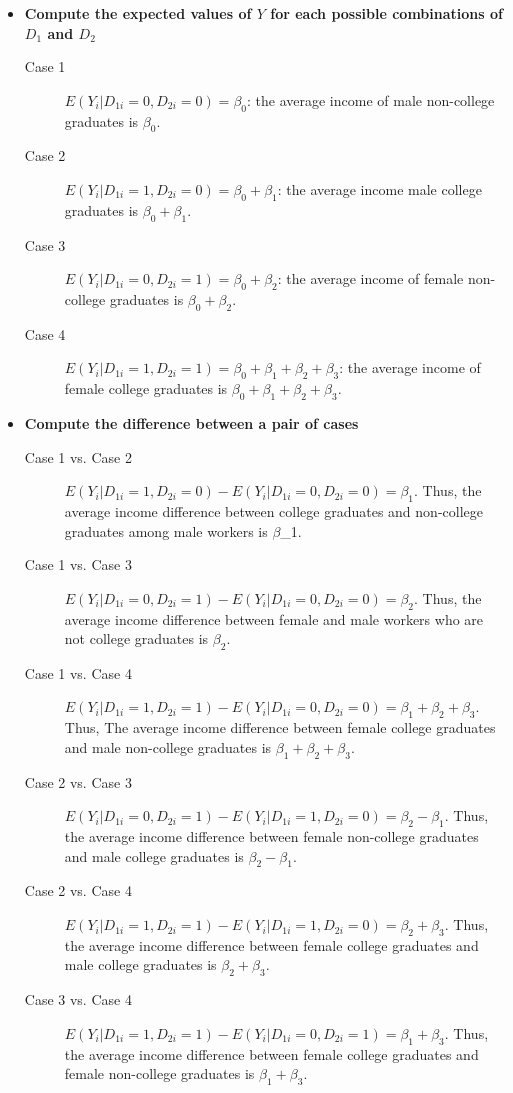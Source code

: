 \documentclass[a4paper,11pt]{article}
\begin{document}
\begin{itemize}
\item \textbf{Compute the expected values of \(Y\) for each possible combinations of \(D_1\) and \(D_2\)}
\label{sec:org00e8688}

\begin{description}
\item[{Case 1}] \(E(Y_i | D_{1i} = 0, D_{2i} = 0) = \beta_0\): the average
income of male non-college graduates is \(\beta_0\).
\item[{Case 2}] \(E(Y_i | D_{1i} = 1, D_{2i} = 0) = \beta_0 + \beta_1\): the
average income male college graduates is \(\beta_0 +
            \beta_1\).
\item[{Case 3}] \(E(Y_i | D_{1i} = 0, D_{2i} = 1) = \beta_0 + \beta_2\): the
average income of female non-college graduates is
\(\beta_0 + \beta_2\).
\item[{Case 4}] \(E(Y_i | D_{1i} = 1, D_{2i} = 1) = \beta_0 + \beta_1 +
            \beta_2 + \beta_3\): the average income of female college
graduates is \(\beta_0 + \beta_1 + \beta_2 + \beta_3\).
\end{description}

\item \textbf{Compute the difference between a pair of cases}
\label{sec:orga128804}

\begin{description}
\item[{Case 1 vs. Case 2}] \(E(Y_i | D_{1i} = 1, D_{2i} = 0) - E(Y_i |
     D_{1i} = 0, D_{2i} = 0) = \beta_1\). Thus, the average income
difference between college graduates and non-college graduates among
male workers is \(\beta\)\_1.
\item[{Case 1 vs. Case 3}] \(E(Y_i | D_{1i} = 0, D_{2i} = 1) - E(Y_i |
     D_{1i} = 0, D_{2i} = 0) = \beta_2\). Thus, the average income
difference between female and male workers who are not college
graduates is \(\beta_2\).
\item[{Case 1 vs. Case 4}] \(E(Y_i | D_{1i} = 1, D_{2i} = 1) - E(Y_i |
     D_{1i} = 0, D_{2i} = 0) = \beta_1 + \beta_2 + \beta_3\). Thus, The
average income difference between female college graduates and
male non-college graduates is \(\beta_1 + \beta_2 + \beta_3\).
\item[{Case 2 vs. Case 3}] \(E(Y_i | D_{1i} = 0, D_{2i} = 1) - E(Y_i |
     D_{1i} = 1, D_{2i} = 0) = \beta_2 - \beta_1\). Thus, the average
income difference between female non-college graduates and male
college graduates is \(\beta_2 - \beta_1\).
\item[{Case 2 vs. Case 4}] \(E(Y_i | D_{1i} = 1, D_{2i} = 1) - E(Y_i |
     D_{1i} = 1, D_{2i} = 0) = \beta_2 + \beta_3\). Thus, the average
income difference between female college graduates and male
college graduates is \(\beta_2 + \beta_3\).
\item[{Case 3 vs. Case 4}] \(E(Y_i | D_{1i} = 1, D_{2i} = 1) - E(Y_i |
     D_{1i} = 0, D_{2i} = 1) = \beta_1 + \beta_3\). Thus, the average
income difference between female college graduates and female
non-college graduates is \(\beta_1 + \beta_3\).
\end{description}


\end{itemize}
\end{document}
